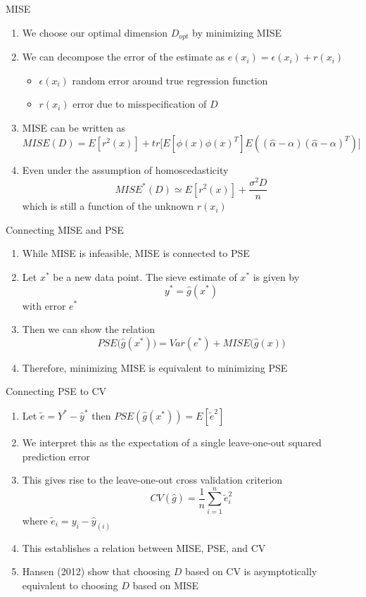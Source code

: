 \documentclass{beamer}
\begin{document}
\begin{frame}{MISE}%
\begin{enumerate}
\item We choose our optimal dimension $D_{opt}$ by minimizing MISE 
\item We can decompose the error of the estimate as $e(x_i) = \epsilon(x_i) + r(x_i)$
\begin{itemize}
  \item $\epsilon(x_i)$ random error around true regression function
  \item $r(x_i)$ error due to misspecification of $D$ 
\end{itemize}\pause
\item MISE can be written as $$MISE(D) = E[r^{2}(x)] + tr\Big[E[\phi(x)\phi(x)^{T}]E\left((\hat{\alpha} - \alpha)(\hat{\alpha} - \alpha)^{T}\right)\Big]$$
\item Even under the assumption of homoscedasticity $$MISE^*(D)\simeq E[r^2(x)] + \frac{\sigma^2 D}{n}$$
which is still a function of the unknown $r(x_i)$
\end{enumerate}
\end{frame}

\begin{frame}{Connecting MISE and PSE}%
\begin{enumerate}
\item While MISE is infeasible, MISE is connected to PSE 
\item Let $x^{*}$ be a new data point. The sieve estimate of $x^{*}$ is given by $$y^{*} = \hat{g}(x^{*})$$ with error $e^{*}$
\item Then we can show the relation $$PSE\Big(\hat{g}(x^{*})\Big) = Var(e^{*}) + MISE\Big(\hat{g}(x)\Big)$$
\item Therefore, minimizing MISE is equivalent to minimizing PSE
\end{enumerate}
\end{frame}
\begin{frame}{Connecting PSE to CV}%
\begin{enumerate}
\item Let $\tilde{e} = Y^{*} - \hat{y}^{*}$ then $PSE(\hat{g}(x^{*}))= E[\tilde{e}^2]$
\item We interpret this as the expectation of a single leave-one-out squared prediction error\pause
\item This gives rise to the leave-one-out cross validation criterion $$CV(\hat{g}) = \frac{1}{n}\sum_{i=1}^n\tilde{e}_{i}^2$$ where $\tilde{e}_i = y_i - \hat{y}_{(i)}$
\item This establishes a relation between MISE, PSE, and CV \pause 
\item Hansen (2012) show that choosing $D$ based on CV is asymptotically equivalent to choosing $D$ based on MISE
\end{enumerate}
\end{frame}
\end{document}
